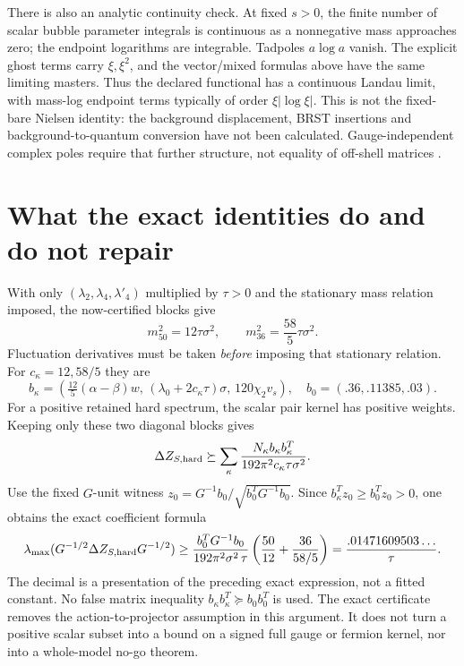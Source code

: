 \documentclass[11pt]{article}
\begin{document}
There is also an analytic continuity check. At fixed $s>0$, the finite
number of scalar bubble parameter integrals is continuous as a
nonnegative mass approaches zero; the endpoint logarithms are integrable.
Tadpoles $a\log a$ vanish. The explicit ghost terms carry $\xi,\xi^2$,
and the vector/mixed formulas above have the same limiting masters.
Thus the declared functional has a continuous Landau limit, with
mass-log endpoint terms typically of order $\xi|\log\xi|$.
This is not the fixed-bare Nielsen identity: the background displacement,
BRST insertions and background-to-quantum conversion have not been
calculated. Gauge-independent complex poles require that further
structure, not equality of off-shell matrices \cite{GambinoGrassi}.



\section{What the exact identities do and do not repair}
With only $(\lambda_2,\lambda_4,\lambda'_4)$ multiplied by $\tau>0$
and the stationary mass relation imposed, the now-certified blocks give
\begin{equation}
 m_{50}^2=12\tau\sigma^2,\qquad
 m_{36}^2=\frac{58}{5}\tau\sigma^2.
\end{equation}
Fluctuation derivatives must be taken \emph{before} imposing that
stationary relation. For $c_\kappa=12,58/5$ they are
\begin{equation}
 b_\kappa=\left(\tfrac{12}{5}(\alpha-\beta)w,\,
       (\lambda_0+2c_\kappa\tau)\sigma,\,
       120\chi_2v_s\right),\quad b_0=(.36,.11385,.03).
\end{equation}
For a positive retained hard spectrum, the scalar pair kernel has
positive weights. Keeping only these two diagonal blocks gives
\begin{equation}
 \Delta Z_{S,\rm hard}\succeq
 \sum_{\kappa}\frac{N_\kappa b_\kappa b_\kappa^T}
                       {192\pi^2c_\kappa\tau\sigma^2}.
\end{equation}
Use the fixed $G$-unit witness
$z_0=G^{-1}b_0/\sqrt{b_0^TG^{-1}b_0}$.
Since $b_\kappa^Tz_0\ge b_0^Tz_0>0$, one obtains the exact
coefficient formula
\begin{equation}
 \lambda_{\max}(G^{-1/2}\Delta Z_{S,\rm hard}G^{-1/2})
 \ge\frac{b_0^TG^{-1}b_0}{192\pi^2\sigma^2\,\tau}
      \left(\frac{50}{12}+\frac{36}{58/5}\right)
 =\frac{.01471609503\ldots}{\tau}.
\end{equation}
The decimal is a presentation of the preceding exact expression,
not a fitted constant. No false matrix inequality
$b_\kappa b_\kappa^T\succeq b_0b_0^T$ is used. The exact certificate
removes the action-to-projector assumption in this argument. It does
not turn a positive scalar subset into a bound on a signed full gauge
or fermion kernel, nor into a whole-model no-go theorem.
\end{document}

